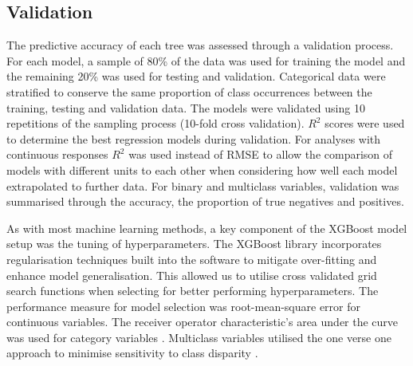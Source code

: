 \documentclass[review,12pt,authoryear]{elsarticle}
\begin{document}
\begin{linenumbers}
\subsection{Validation}

The predictive accuracy of each tree was assessed through a validation process. For each model, a sample of 80\% of the data was used for training the model and the remaining 20\% was used for testing and validation. Categorical data were stratified to conserve the same proportion of class occurrences between the training, testing and validation data. The models were validated using 10 repetitions of the sampling process (10-fold cross validation). $R^2$ scores were used to determine the best regression models during validation. For analyses with continuous responses $R^2$ was used instead of RMSE to allow the comparison of  models with different units to each other when considering how well each model extrapolated to further data. For binary and multiclass variables, validation was summarised through the accuracy, the proportion of true negatives and positives.
\par
As with most machine learning methods, a key component of the XGBoost model setup was the tuning of hyperparameters. The XGBoost library incorporates regularisation techniques built into the software to mitigate over-fitting and enhance model generalisation. This allowed us to utilise cross validated grid search functions when selecting for better performing hyperparameters. The performance measure for model selection was root-mean-square error for continuous variables. The receiver operator characteristic's area under the curve was used for category variables \citep{hanley1982meaning}. Multiclass variables utilised the one verse one approach to minimise sensitivity to class disparity \citep{ferriExperimentalComparisonPerformance2009,handSimpleGeneralisationArea2001}.



\end{linenumbers}
\end{document}
